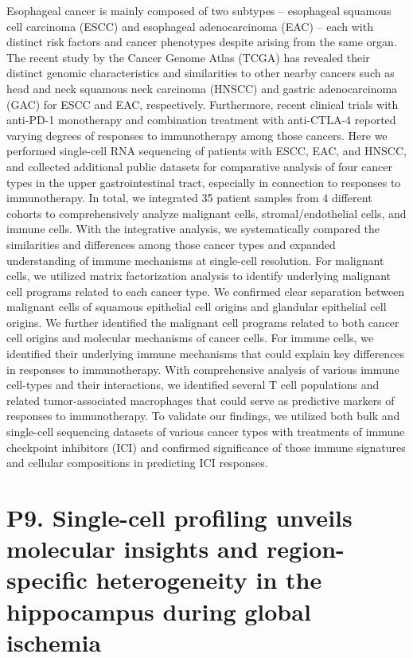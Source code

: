\noindent
Esophageal cancer is mainly composed of two subtypes – esophageal squamous cell carcinoma (ESCC) and esophageal adenocarcinoma (EAC) – each with distinct risk factors and cancer phenotypes despite arising from the same organ. The recent study by the Cancer Genome Atlas (TCGA) has revealed their distinct genomic characteristics and similarities to other nearby cancers such as head and neck squamous neck carcinoma (HNSCC) and gastric adenocarcinoma (GAC) for ESCC and EAC, respectively. Furthermore, recent clinical trials with anti-PD-1 monotherapy and combination treatment with anti-CTLA-4 reported varying degrees of responses to immunotherapy among those cancers. Here we performed single-cell RNA sequencing of patients with ESCC, EAC, and HNSCC, and collected additional public datasets for comparative analysis of four cancer types in the upper gastrointestinal tract, especially in connection to responses to immunotherapy. In total, we integrated 35 patient samples from 4 different cohorts to comprehensively analyze malignant cells, stromal/endothelial cells, and immune cells. With the integrative analysis, we systematically compared the similarities and differences among those cancer types and expanded understanding of immune mechanisms at single-cell resolution. For malignant cells, we utilized matrix factorization analysis to identify underlying malignant cell programs related to each cancer type. We confirmed clear separation between malignant cells of squamous epithelial cell origins and glandular epithelial cell origins. We further identified the malignant cell programs related to both cancer cell origins and molecular mechanisms of cancer cells. For immune cells, we identified their underlying immune mechanisms that could explain key differences in responses to immunotherapy. With comprehensive analysis of various immune cell-types and their interactions, we identified several T cell populations and related tumor-associated macrophages that could serve as predictive markers of responses to immunotherapy. To validate our findings, we utilized both bulk and single-cell sequencing datasets of various cancer types with treatments of immune checkpoint inhibitors (ICI) and confirmed significance of those immune signatures and cellular compositions in predicting ICI responses.
\newpage


\section*{P9. Single-cell profiling unveils molecular insights and region-specific heterogeneity in the hippocampus during global ischemia}


